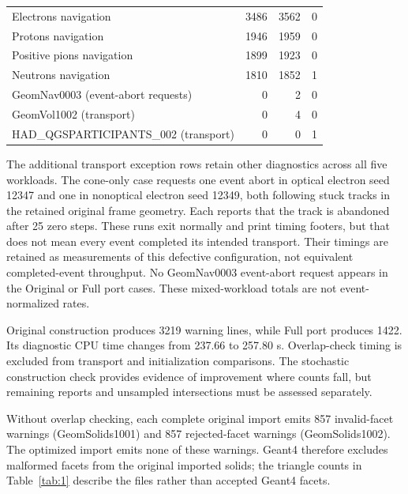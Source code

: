 \begin{table}[htbp]
\begin{tabularx}{\textwidth}{@{}Xrrr@{}}
Electrons navigation & 3486 & 3562 & 0 \\

Protons navigation & 1946 & 1959 & 0 \\

Positive pions navigation & 1899 & 1923 & 0 \\

Neutrons navigation & 1810 & 1852 & 1 \\

GeomNav0003 (event-abort requests) & 0 & 2 & 0 \\

GeomVol1002 (transport) & 0 & 4 & 0 \\

HAD\_QGSPARTICIPANTS\_002 (transport) & 0 & 0 & 1 \\

\bottomrule

\end{tabularx}

\end{table}

The additional transport exception rows retain other diagnostics across all five workloads. The cone-only case
requests one event abort in optical electron seed 12347 and one in nonoptical electron seed 12349, both
following stuck tracks in the retained original frame geometry. Each reports that the track is abandoned after
25 zero steps. These runs exit normally and print timing footers, but that does not mean every event completed
its intended transport. Their timings are retained as measurements of this defective configuration, not
equivalent completed-event throughput. No GeomNav0003 event-abort request appears in the Original or Full port
cases. These mixed-workload totals are not event-normalized rates.

Original construction produces 3219 warning lines, while Full port produces 1422. Its diagnostic CPU time
changes from 237.66 to 257.80 s. Overlap-check timing is excluded from transport and initialization
comparisons. The stochastic construction check provides evidence of improvement where counts fall, but
remaining reports and unsampled intersections must be assessed separately.

Without overlap checking, each complete original import emits 857 invalid-facet warnings (GeomSolids1001) and
857 rejected-facet warnings (GeomSolids1002). The optimized import emits none of these warnings. Geant4
therefore excludes malformed facets from the original imported solids; the triangle counts in Table~\ref{tab:1}
describe the files rather than accepted Geant4 facets.

